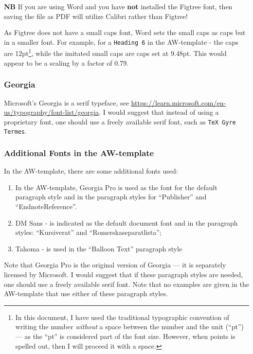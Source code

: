 \documentclass[12pt, twoside]{article}
\begin{document}
\textbf{NB} If you are using Word and you have \textbf{not} installed the Figtree font, then saving the file as PDF will utilize Calibri rather than Figtree!

As Figtree does not have a small caps font, Word sets the small caps as caps but in a smaller font. For example, for a \texttt{Heading 6} in the AW-template - the caps are 12pt\footnote{In this document, I have used the traditional typographic convention of writing the number \textit{without} a space between the number and the unit (\enquote{pt}) --- as the \enquote{pt} is considered part of the font size. However, when points is spelled out, then I will proceed it with a space.}, while the imitated small caps are caps set at 9.48pt. This would appear to be a scaling by a factor of \num{0.79}.

\subsubsection{Georgia}
Microsoft's Georgia is a serif typeface, see \url{https://learn.microsoft.com/en-us/typography/font-list/georgia}. I would suggest that instead of using a proprietary font, one should use a freely available serif font, such as \texttt{TeX Gyre Termes}.

\subsubsection{Additional Fonts in the AW-template}
\label{sec:cycle3AdditionalFonts}

In the AW-template, there are some additional fonts used:
\begin{enumerate}
    \item In the AW-template, Georgia Pro is used as the font for the default paragraph style and in the paragraph styles for \enquote{Publisher} and \enquote{EndnoteReference}.

    \item DM Sans - is indicated as the default document font and in the paragraph styles: \enquote{Kursiverat} and \enquote{Romerskaseparatlista};

    \item Tahoma - is used in the \enquote{Balloon Text} paragraph style
\end{enumerate}

Note that Georgia Pro is the original version of Georgia --- it is separately licensed by Microsoft. I would suggest that if these paragraph styles are needed, one should use a freely available serif font. Note that no examples are given in the AW-template that use either of these paragraph styles.
\end{document}

